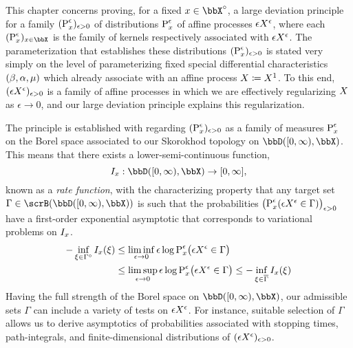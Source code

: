This chapter concerns proving, for a fixed $\stateVar \in \stateSpace^\circ$, a large deviation principle for a family $({\operatorname{P}}^\epsilon_x)_{\epsilon>0}$ of distributions ${\operatorname{P}}^\epsilon_x$ of affine processes $\epsilon X^\epsilon$, where each $(\Prb^\epsilon_\stateVar)_{\stateVar\in\stateSpace}$ is the family of kernels respectively associated with $\epsilon X^\epsilon$.
The parameterization that establishes these distributions $({\operatorname{P}}^\epsilon_x)_{\epsilon>0}$ is stated very simply on the level of parameterizing fixed special differential characteristics $(\beta, \alpha, \mu)$ which already associate with an affine process $X \coloneqq X^1$.
To this end, $(\epsilon X^\epsilon)_{\epsilon>0}$ is a family of affine processes in which we are effectively regularizing $X$ as $\epsilon \rightarrow 0$, and our large deviation principle explains this regularization.

The principle is established with regarding $({\operatorname{P}}^\epsilon_x)_{\epsilon>0}$ as a family of measures ${\operatorname{P}}^\epsilon_x$ on the Borel space associated to our Skorokhod topology on $\pathSpace{[0,\infty)}{\stateSpace}$.
This means that there exists a lower-semi-continuous function,
\[
  \rf_\stateVar: \pathSpace{[0,\infty)}{\stateSpace} \rightarrow [0,\infty],
\]
known as a \emph{rate function}, with the characterizing property that any target set $\Gamma \in \scrB(\pathSpace{[0,\infty)}{\stateSpace})$ is such that the probabilities $\big({\operatorname{P}}^\epsilon_x( \epsilon X^\epsilon \in \Gamma)\big)_{\epsilon>0}$ have a first-order exponential asymptotic that corresponds to variational problems on $I_x$.
\begin{align*}
  -\inf_{\xi \in \Gamma^\circ} I_x(\xi) 
  &\leq \liminf_{\epsilon\rightarrow0} \epsilon\log{\operatorname{P}}^\epsilon_x\big( \epsilon X^\epsilon \in \Gamma \big) \\
  &\leq \limsup_{\epsilon\rightarrow0} \epsilon\log{\operatorname{P}}^\epsilon_x\big( \epsilon X^\epsilon \in \Gamma \big) 
  \leq -\inf_{\xi \in \overline\Gamma} I_x(\xi) 
\end{align*}
Having the full strength of the Borel space on $\pathSpace{[0,\infty)}{\stateSpace}$, our admissible sets $\Gamma$ can include a variety of tests on $\epsilon X^\epsilon$.
For instance, suitable selection of $\Gamma$ allows us to derive asymptotics of probabilities associated with stopping times, path-integrals, and finite-dimensional distributions of $(\epsilon X^\epsilon)_{\epsilon>0}$.

